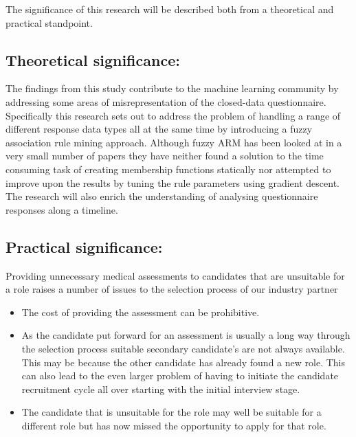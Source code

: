 



The significance of this research will be described both from a theoretical and practical standpoint.

\subsection{Theoretical significance:}

The findings from this study contribute to the machine learning community by addressing some areas of misrepresentation of the closed-data questionnaire. Specifically this research sets out to address the problem of handling a range of different response data types all at the same time by introducing a fuzzy association rule mining approach. Although fuzzy ARM has been looked at in a very small number of papers they have neither found a solution to the time consuming task of creating membership functions statically nor attempted to improve upon the results by tuning the rule parameters using gradient descent. The research will also enrich the understanding of analysing questionnaire responses along a timeline.  

\subsection{Practical significance:}

Providing unnecessary medical assessments to candidates that are unsuitable for a role raises a number of issues to the selection process of our industry partner


\begin{itemize}
	\item The cost of providing the assessment can be prohibitive.
	\item As the candidate put forward for an assessment is usually a long way through the selection process suitable secondary candidate's are not always available. This may be because the other candidate has already found a new role. This can also lead to the even larger problem of having to initiate the candidate recruitment cycle all over starting with the initial interview stage. 
	\item The candidate that is unsuitable for the role may well be suitable for a different role but has now missed the opportunity to apply for that role.
\end{itemize}



